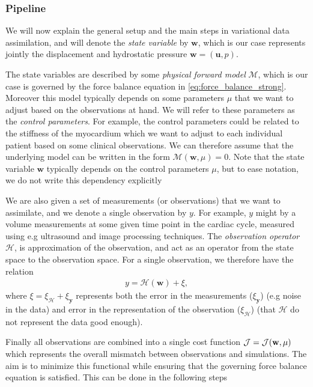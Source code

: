 \subsubsection{Pipeline}
\label{sec:data_assimilation_pipeline}

We will now explain the general setup and the main steps in variational data
assimilation, and will denote the \emph{state variable} by
$\mathbf{w}$, which is our case represents jointly the displacement
and hydrostatic pressure $\mathbf{w}=(\mathbf{u}, p)$.

The state variables are described by some \emph{physical forward
model} $\mathcal{M}$, which is our case is governed by the force balance
equation in \eqref{eq:force_balance_strong}. Moreover this model
typically depends on some parameters $\mu$ that we want to
adjust based on the observations at hand. We will refer to these
parameters as the \emph{control parameters}. For example, the control
parameters could be related to the stiffness of the myocardium which
we want to adjust to each individual patient based on some
clinical observations. We can therefore assume that the underlying
model can be written in the form $\mathcal{M}(\mathbf{w}, \mu) =
0$. Note that the state variable $\mathbf{w}$ typically depends on the
control parameters $\mu$, but to ease notation, we do not write this
dependency explicitly

We are also given a set of measurements (or observations) that we want
to assimilate, and we denote a single observation by $y$.
For example, $y$ might by a volume measurements at some given time
point in the cardiac cycle, measured using e.g ultrasound and image
processing techniques. The \emph{observation operator} $\mathcal{H}$,
is approximation of the observation, and act as an operator from the
state space to the observation space. For a single observation, we
therefore have the relation
\begin{align}
  y = \mathcal{H}(\mathbf{w}) + \xi, 
\end{align}
where $\xi = \xi_{\mathbf{\mathcal{H}}} + \xi_{\mathbf{y}}$ represents
both the error in the measurements ($\xi_{\mathbf{y}}$) (e.g
noise in the data) and error in the representation of the observation
($\xi_{\mathbf{\mathcal{H}}}$) (that $\mathcal{H}$ do not represent
the data good enough).

Finally all observations are combined into a single cost function
$\mathcal{J} = \mathcal{J}(\mathbf{w}, \mu)$ which represents the overall mismatch between
observations and simulations. The aim is to minimize this functional
while ensuring that the governing force balance equation is
satisfied. This can be done in the following steps


